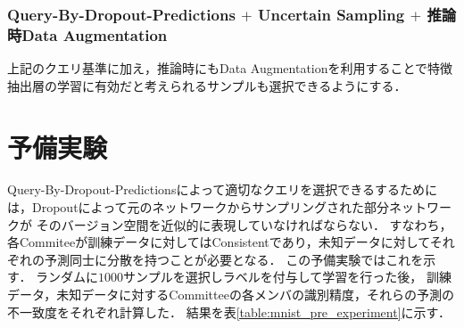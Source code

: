 \subsubsection{Query-By-Dropout-Predictions $+$ Uncertain Sampling $+$ 推論時Data Augmentation}
上記のクエリ基準に加え，推論時にもData Augmentationを利用することで特徴抽出層の学習に有効だと考えられるサンプルも選択できるようにする．


\section{予備実験}
Query-By-Dropout-Predictionsによって適切なクエリを選択できるするためには，Dropoutによって元のネットワークからサンプリングされた部分ネットワークが
そのバージョン空間を近似的に表現していなければならない．
すなわち，各Commiteeが訓練データに対してはConsistentであり，未知データに対してそれぞれの予測同士に分散を持つことが必要となる．
この予備実験ではこれを示す．
ランダムに$1000$サンプルを選択しラベルを付与して学習を行った後，
訓練データ，未知データに対するCommitteeの各メンバの識別精度，それらの予測の不一致度をそれぞれ計算した．
結果を表\ref{table:mnist_pre_experiment}に示す．

